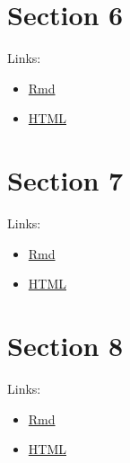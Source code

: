 \documentclass[
  oneside]{book}
\begin{document}
\hypertarget{section-6}{%
\section{Section 6}\label{section-6}}

Links:

\begin{itemize}
\item
  \href{06-3-ex-sol-ADHD.Rmd}{Rmd}
\item
  \href{06-3-ex-sol-ADHD.html}{HTML}
\end{itemize}

\hypertarget{section-7}{%
\section{Section 7}\label{section-7}}

Links:

\begin{itemize}
\item
  \href{07-3-ex-sol-ADHD.Rmd}{Rmd}
\item
  \href{07-3-ex-sol-ADHD.html}{HTML}
\end{itemize}

\hypertarget{section-8}{%
\section{Section 8}\label{section-8}}

Links:

\begin{itemize}
\item
  \href{08-5-ex-sol-ADHD.Rmd}{Rmd}
\item
  \href{08-5-ex-sol-ADHD.html}{HTML}
\end{itemize}

  
\end{document}
